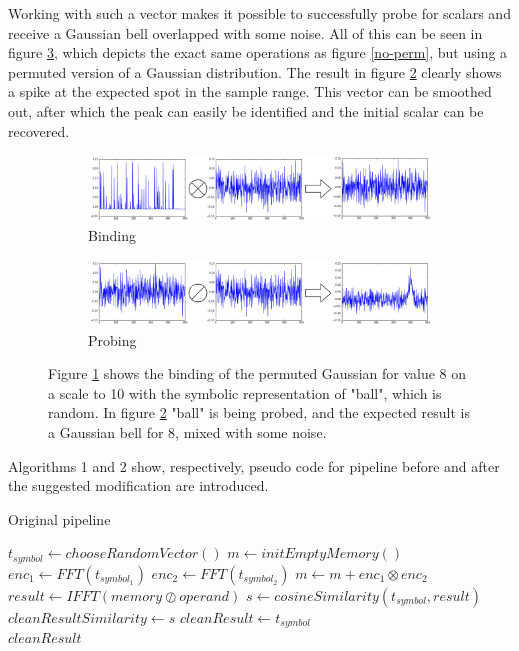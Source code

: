 \documentclass[conference]{IEEEtran}
\begin{document}
	Working with such a vector makes it possible to successfully probe for scalars and receive a Gaussian bell overlapped with some noise.
All of this can be seen in figure \ref{perm}, which depicts the exact same operations as figure \ref{no-perm}, but using a permuted version of a Gaussian distribution.
The result in figure \ref{perm-b} clearly shows a spike at the expected spot in the sample range.
This vector can be smoothed out, after which the peak can easily be identified and the initial scalar can be recovered.
	
	\begin{figure}
		\begin{subfigure}{1\columnwidth}
			\includegraphics[width=\columnwidth]{img/scalar-post-perm.png}
			\caption{Binding}
			\label{perm-a}
		\end{subfigure}
		\begin{subfigure}{1\columnwidth}
			\includegraphics[width=\columnwidth]{img/scalar-post-perm-probe.png}
			\caption{Probing}
			\label{perm-b}
		\end{subfigure}
		\caption{Figure \ref{perm-a} shows the binding of the permuted Gaussian for value 8 on a scale to 10 with the symbolic representation of "ball", which is random.
In figure \ref{perm-b} "ball" is being probed, and the expected result is a Gaussian bell for 8, mixed with some noise.}
		\label{perm}
	\end{figure}
	
	Algorithms 1 and 2 show, respectively, pseudo code for pipeline before and after the suggested modification are introduced.
	
	\begin{algorithm}
		\caption{Original pipeline}
		\begin{algorithmic}[1]
			\State $t_{symbol} \gets chooseRandomVector()$
			\EndFor
			\State $m \gets initEmptyMemory()$
			\State $enc_1 \gets FFT(t_{symbol_1})$
			\State $enc_2 \gets FFT(t_{symbol_2})$
			\State $m \gets m + enc_1 \otimes enc_2$
			\EndFor		
			\State $result \gets IFFT(memory \oslash operand)$
			\State $s \gets cosineSimilarity(t_{symbol}, result)$
			\State $cleanResultSimilarity \gets s$
			\State $cleanResult \gets t_{symbol}$
			\EndIf
			\EndFor \\
			\Return $cleanResult$
			\EndFunction
		\end{algorithmic}
	\end{algorithm}
	
\end{document}
